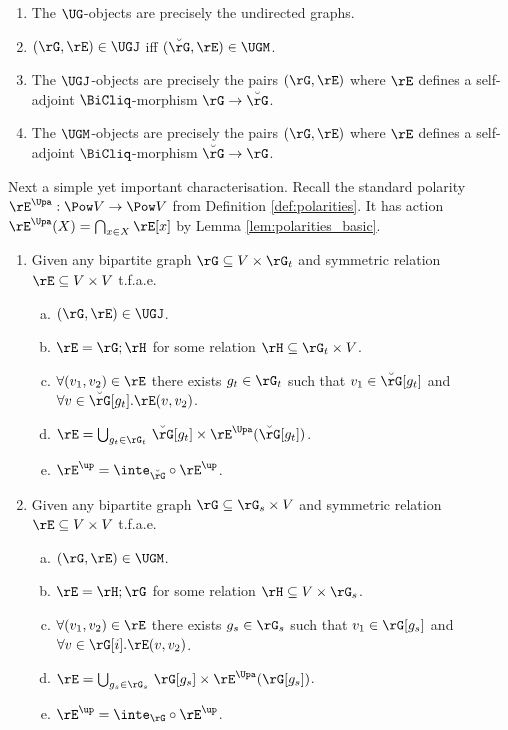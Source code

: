 \documentclass{article}
\begin{document}
\begin{lemma}
\item
\begin{enumerate}
\item
The $\UG$-objects are precisely the undirected graphs.
\item
$(\rG,\rE) \in \UGJ$ iff $(\breve{\rG},\rE) \in \UGM$.
\item
The $\UGJ$-objects are precisely the pairs $(\rG,\rE)$ where $\rE$ defines a self-adjoint $\BiCliq$-morphism $\rG \to \breve{\rG}$.
\item
The $\UGM$-objects are precisely the pairs $(\rG,\rE)$ where $\rE$ defines a self-adjoint $\BiCliq$-morphism $\breve{\rG} \to \rG$.
\end{enumerate}
\end{lemma}


\smallskip
Next a simple yet important characterisation.
Recall the standard polarity $\rE^\Upa : \Pow V \to \Pow V$ from Definition \ref{def:polarities}. It has action $\rE^\Upa(X) = \bigcap_{x \in X} \rE[x]$ by Lemma \ref{lem:polarities_basic}.
\smallskip


\begin{lemma}
\label{lem:char_ug_jm}
\item
\begin{enumerate}
\item
Given any bipartite graph $\rG \subseteq V \times \rG_t$ and symmetric relation $\rE \subseteq V \times V$ t.f.a.e.\
\begin{enumerate}[a.]
\item
$(\rG,\rE) \in \UGJ$.
\item
$\rE = \rG ; \rH$ for some relation $\rH \subseteq \rG_t \times V$.
\item
$\forall (v_1,v_2) \in \rE$ there exists $g_t \in \rG_t$ such that $v_1 \in \breve{\rG}[g_t]$ and $\forall v \in \breve{\rG}[g_t].\rE(v,v_2)$.
\item
$\rE = \bigcup_{g_t \in \rG_t} \, \breve{\rG}[g_t] \times \rE^\Upa(\breve{\rG}[g_t])$.
\item
$\rE^\up = \inte_{\breve{\rG}} \circ \rE^\up$.


\end{enumerate}
\item
Given any bipartite graph $\rG \subseteq \rG_s \times V$ and symmetric relation $\rE \subseteq V \times V$ t.f.a.e.\
\begin{enumerate}[a.]
\item
$(\rG,\rE) \in \UGM$.
\item
$\rE = \rH ; \rG$ for some relation $\rH \subseteq V \times \rG_s$.
\item
$\forall (v_1,v_2) \in \rE$ there exists $g_s \in \rG_s$ such that $v_1 \in \rG[g_s]$ and $\forall v \in \rG[i].\rE(v,v_2)$.
\item
$\rE = \bigcup_{g_s \in \rG_s} \, \rG[g_s] \times \rE^\Upa(\rG[g_s])$.
\item
$\rE^\up = \inte_\rG \circ \rE^\up$.
\end{enumerate}
\end{enumerate}
\end{lemma}
\end{document}
